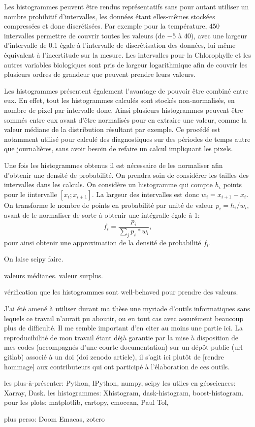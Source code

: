 \documentclass[index]{subfiles}
\begin{document}
Les histogrammes peuvent être rendus représentatifs sans pour autant utiliser un nombre prohibitif d'intervalles, les données étant elles-mêmes stockées compressées et donc discrétisées. Par exemple pour la température, 450 intervalles permettre de couvrir toutes les valeurs (de \qty{-5}{\dC} à \qty{40}{\dC}), avec une largeur d'intervalle de \qty{0.1}{\dC} égale à l'intervalle de discrétisation des données, lui même équivalent à l'incertitude sur la mesure.
Les intervalles pour la Chlorophylle et les autres variables biologiques sont pris de largeur logarithmique afin de couvrir les plusieurs ordres de grandeur que peuvent prendre leurs valeurs.

Les histogrammes présentent également l'avantage de pouvoir être combiné entre eux.
En effet, tout les histogrammes calculés sont stockés non-normalisés, en nombre de pixel par intervalle donc. Ainsi plusieurs histogrammes peuvent être sommés entre eux avant d'être normalisés pour en extraire une valeur, comme la valeur médiane de la distribution résultant par exemple.
Ce procédé est notamment utilisé pour calculé des diagnostiques sur des périodes de temps autre que journalières, sans avoir besoin de refaire un calcul impliquant les pixels.

Une fois les histogrammes obtenus il est nécessaire de les normaliser afin d'obtenir une densité de probabilité. On prendra soin de considérer les tailles des intervalles dans les calculs.
On considère un histogramme qui compte \(h_{i}\) points pour le i\ieme intervalle \(\left[x_{i}; x_{i+1} \right]\).
La largeur des intervalles est donc \(w_{i} = x_{i+1}-x_{i}\). On transforme le nombre de points en probabilité par unité de valeur \(p_{i} = h_{i} / w_{i} \), avant de le normaliser de sorte à obtenir une intégralle égale à 1:
\begin{equation}
  f_{i} = \frac{p_{i}}{\sum_{j}{p_{i}*w_{i}}},
\end{equation}
pour ainsi obtenir une approximation de la densité de probabilité \(f_{i}\).

On laise scipy faire.

valeurs médianes.
valeur surplus.

vérification que les histogrammes sont well-behaved pour prendre des valeurs.

\label{sec:ref-info}

J'ai été amené à utiliser durant ma thèse une myriade d'outils informatiques sans lequels ce travail n'aurait pu aboutir, ou en tout cas avec assurément beaucoup plus de difficulté.
Il me semble important d'en citer au moins une partie ici.
La reproducibilité de mon travail étant déjà garantie par la mise à disposition de mes codes (accompagnés d'une courte documentation) sur un dépôt public (url gitlab) associé à un doi (doi zenodo article), il s'agit ici plutôt de [rendre hommage] aux contributeurs qui ont participé à l'élaboration de ces outils.

les plus-à-présenter: Python, IPython, numpy, scipy
les utiles en géosciences: Xarray, Dask.
les histogrammes: Xhistogram, dask-histogram, boost-histogram.
pour les plots: matplotlib, cartopy, cmocean, Paul Tol,

plus perso: Doom Emacas, zotero
\end{document}
